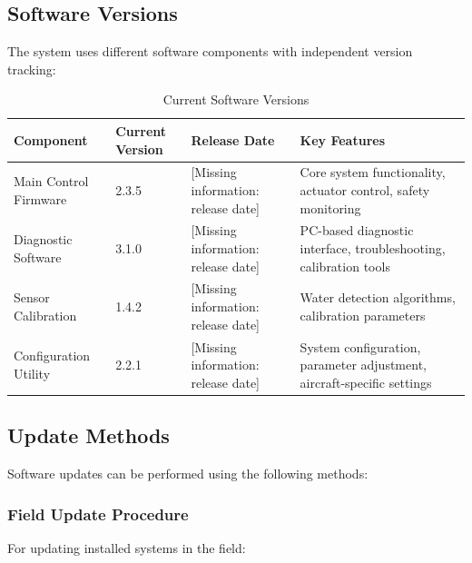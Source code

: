 \documentclass[12pt,a4paper,twoside,openright]{book}
\newcommand{\tabletextfont}{\normalfont\rmfamily}
\newcommand{\tableheadfont}{\normalfont\bfseries}
\begin{document}
\subsection{Software Versions}

The system uses different software components with independent version tracking:

\begin{table}[h]
\centering
\setlength{\tabcolsep}{5pt} %
\begin{tabular}{|p{}|p{}|p{}|p{}|}
\hline
\tableheadfont\textbf{Component} & \tableheadfont\textbf{Current Version} & \tableheadfont\textbf{Release Date} & \tableheadfont\textbf{Key Features} \\
\hline
\tabletextfont Main Control Firmware & 2.3.5 & {\color{missingred}[Missing information: release date]} & Core system functionality, actuator control, safety monitoring \\
\hline
\tabletextfont Diagnostic Software & 3.1.0 & {\color{missingred}[Missing information: release date]} & PC-based diagnostic interface, troubleshooting, calibration tools \\
\hline
\tabletextfont Sensor Calibration & 1.4.2 & {\color{missingred}[Missing information: release date]} & Water detection algorithms, calibration parameters \\
\hline
\tabletextfont Configuration Utility & 2.2.1 & {\color{missingred}[Missing information: release date]} & System configuration, parameter adjustment, aircraft-specific settings \\
\hline
\end{tabular}
\caption{Current Software Versions}
\end{table}

\subsection{Update Methods}

Software updates can be performed using the following methods:

\subsubsection{Field Update Procedure}

For updating installed systems in the field:
\end{document}

